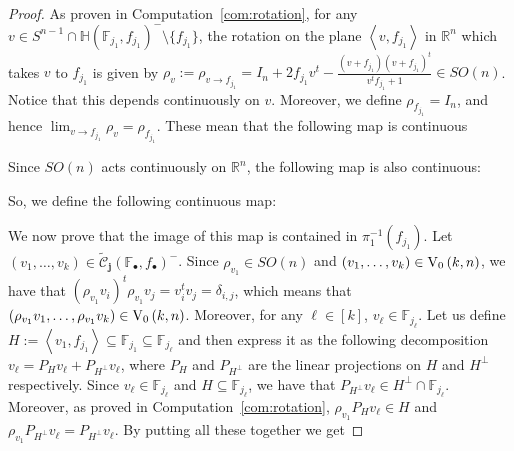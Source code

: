 \begin{proof}
As proven in Computation~\ref{com:rotation}, for any $v\in S^{n-1}\cap\mathbb{H}{\left(\mathbb{F}_{j_1},f_{j_1}\right)}^-\setminus\{f_{j_1}\}$, the rotation on the plane $\left<v,f_{j_1}\right>$ in $\mathbb{R}^n$ which takes $v$ to $f_{j_1}$ is given by
$\rho_v:=\rho_{v\to f_{j_1}}=I_n+2f_{j_1}v^t-\frac{(v+f_{j_1})(v+f_{j_1})^t}{v^tf_{j_1}+1}\in SO(n)$.
Notice that this depends continuously on $v$. Moreover, we define $\rho_{f_{j_1}}=I_n$, and hence $\lim_{v\to f_{j_1}}\rho_v=\rho_{f_{j_1}}$. These mean that the following map is continuous
\begin{center}
\end{center}
Since $SO(n)$ acts continuously on $\mathbb{R}^n$, the following map is also continuous:
\begin{center}
\end{center}
So, we define the following continuous map:
\begin{center}
\end{center}
We now prove that the image of this map is contained in $\pi_1^{-1}(f_{j_1})$. Let $(v_1,\ldots,v_k)\in\tilde{\mathcal{C}}_{\mathbf{j}}{\left(\mathbb{F}_{\bullet},f_{\bullet}\right)}^-$. Since $\rho_{v_1}\in SO(n)$ and $(v_1,\ldots,v_k)\in\StO{k}{n}$, we have that $(\rho_{v_1}v_i)^t\rho_{v_1}v_j=v_i^tv_j=\delta_{i,j}$, which means that $(\rho_{v_1}v_1,\ldots,\rho_{v_1}v_k)\in\StO{k}{n}$. Moreover, for any $\ell\in[k]$, $v_{\ell}\in\mathbb{F}_{j_{\ell}}$. Let us define $H:=\left<v_1,f_{j_1}\right>\subseteq\mathbb{F}_{j_1}\subseteq\mathbb{F}_{j_{\ell}}$ and then express it as the following decomposition $v_{\ell}=P_Hv_{\ell}+P_{H^{\perp}}v_{\ell}$, where $P_H$ and $P_{H^{\perp}}$ are the linear projections on $H$ and $H^{\perp}$ respectively. Since $v_{\ell}\in\mathbb{F}_{j_{\ell}}$ and $H\subseteq\mathbb{F}_{j_{\ell}}$, we have that $P_{H^{\perp}}v_{\ell}\in H^{\perp}\cap\mathbb{F}_{j_{\ell}}$. Moreover, as proved in Computation~\ref{com:rotation}, $\rho_{v_1}P_Hv_{\ell}\in H$ and $\rho_{v_1}P_{H^{\perp}}v_{\ell}=P_{H^{\perp}}v_{\ell}$. By putting all these together we get

\end{proof}
